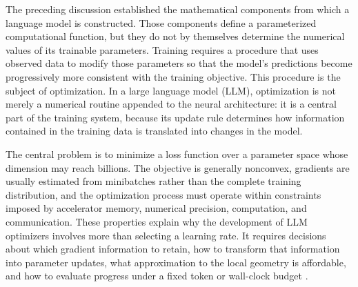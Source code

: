 
The preceding discussion established the mathematical components from which a
language model is constructed. Those components define a parameterized
computational function, but they do not by themselves determine the numerical
values of its trainable parameters. Training requires a procedure that uses
observed data to modify those parameters so that the model's predictions
become progressively more consistent with the training objective. This
procedure is the subject of optimization. In a large language model (LLM),
optimization is not merely a numerical routine appended to the neural
architecture: it is a central part of the training system, because its update
rule determines how information contained in the training data is translated
into changes in the model.

The central problem is to minimize a loss function over a parameter space
whose dimension may reach billions. The objective is generally nonconvex,
gradients are usually estimated from minibatches rather than the complete
training distribution, and the optimization process must operate within
constraints imposed by accelerator memory, numerical precision, computation,
and communication. These properties explain why the development of LLM
optimizers involves more than selecting a learning rate. It requires decisions
about which gradient information to retain, how to transform that information
into parameter updates, what approximation to the local geometry is affordable,
and how to evaluate progress under a fixed token or wall-clock budget
\parencite{Bottou2018Optimization,Ranganath2026Navigating}.


